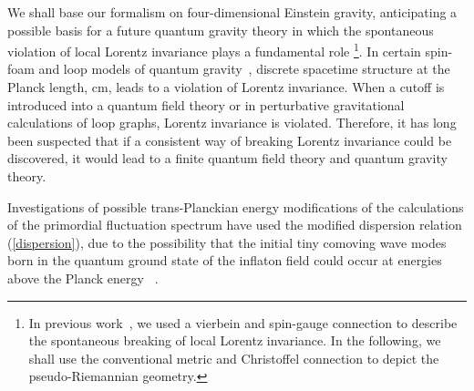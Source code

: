 \documentclass[a4paper,12pt]{article}
\begin{document}
We shall base our formalism on four-dimensional Einstein gravity,
anticipating a possible basis for a future quantum gravity theory in which the
spontaneous violation of local Lorentz invariance plays a fundamental role
\footnote{In previous work~\cite{Moffat,Moffat2}, we used a vierbein and
spin-gauge connection to describe the spontaneous breaking of local Lorentz
invariance. In the following, we shall use the conventional metric
\coordHE{} and Christoffel connection \myHighlight{$\Gamma^\lambda_{\mu\nu}$}\coordHE{} to depict the
pseudo-Riemannian geometry.}. In certain
spin-foam and loop models of quantum gravity~\cite{Smolin,Oriti}, discrete spacetime
structure at the Planck length, \coordHE{} cm, leads to a violation of
Lorentz invariance. When a cutoff is introduced into a quantum field theory or in
perturbative gravitational calculations of loop graphs, Lorentz invariance is
violated. Therefore, it has long been suspected that if a consistent way of breaking
Lorentz invariance could be discovered, it would lead to a finite quantum field
theory and quantum gravity theory.

Investigations of possible trans-Planckian energy modifications of the calculations
of the primordial fluctuation spectrum have used the modified dispersion relation
(\ref{dispersion}), due to the possibility that the initial tiny comoving wave modes
born in the quantum ground state of the inflaton field could occur at energies above
the Planck energy \coordHE{}~\cite{Brandenberger}.
\end{document}
